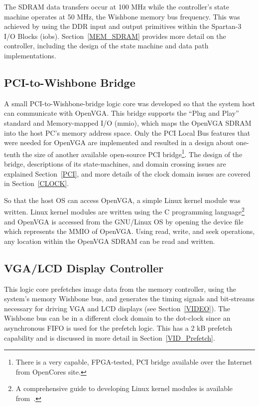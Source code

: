The SDRAM data transfers occur at 100 MHz while the controller's state machine
operates at 50 MHz, the Wishbone memory bus frequency. This was achieved by using
the DDR input and output primitives within the Spartan-3 I/O
Blocks (\gls{iob}s).
Section~\ref{MEM_SDRAM} provides more detail on the controller, including the
design of the state machine and data path implementations.


\subsection{PCI-to-Wishbone Bridge}
\label{OPENVGA_PCI}
A small PCI-to-Wishbone-bridge logic core was developed so that the system host
can communicate with OpenVGA. This bridge supports the ``Plug and Play'' standard
and Memory-mapped I/O (\gls{mmio}), which maps the OpenVGA SDRAM into the host PC's memory
address space. Only the PCI Local Bus features that were needed for OpenVGA are
implemented and resulted in a design about one-tenth the size of another
available open-source PCI bridge\footnote{There is a very capable, FPGA-tested,
PCI bridge available over the Internet from OpenCores site.}. The design of the
bridge, descriptions of its state-machines, and domain crossing issues are
explained Section~\ref{PCI}, and more details of the clock domain issues are
covered in Section~\ref{CLOCK}.

So that the host OS can access OpenVGA, a simple Linux kernel module was written.
Linux kernel modules are written using the C programming language\footnote{A
comprehensive guide to developing Linux kernel modules is available
from~\cite{salzman:lkm}.} and OpenVGA is accessed from the GNU/Linux OS by
opening the device file which represents the MMIO of OpenVGA. Using read, write,
and seek operations, any location within the OpenVGA SDRAM can be read and
written.


\subsection{VGA/LCD Display Controller}
This logic core prefetches image data from the memory controller, using the
system's memory Wishbone bus, and generates the timing signals and bit-streams
necessary for driving VGA and LCD displays (see Section~\ref{VIDEO}). The
Wishbone bus can be in a different clock domain to the dot-clock since an
asynchronous FIFO is used for the prefetch logic. This has a 2 kB prefetch
capability and is discussed in more detail in Section~\ref{VID_Prefetch}.

